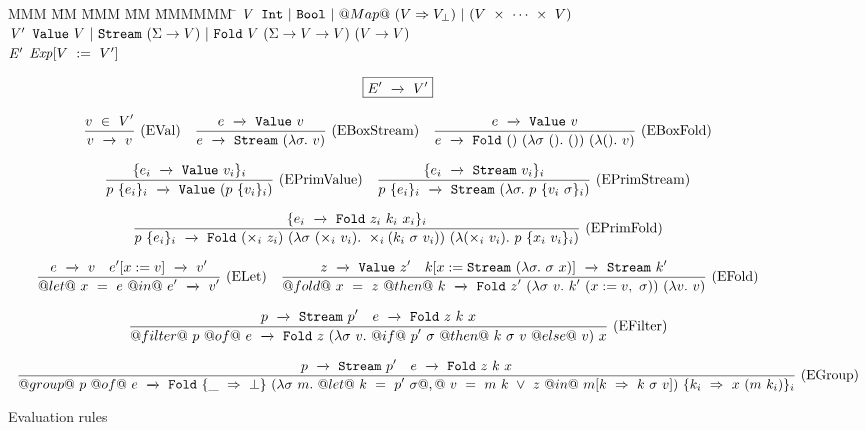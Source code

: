
\begin{figure*}

\begin{tabbing}
MMM \= MM \= MMM \= MM \= MMMMMM \= \kill
$\mathit{V}$
\GrammarDef
  $\mathtt{Int}~|~\mathtt{Bool}~|~@Map@~(V \Rightarrow V_\bot)~|~(V~\times~\cdots~\times~V)$
\\
$\mathit{V'}$
\GrammarDef
  $\texttt{Value}~V~|~\texttt{Stream}~(\Sigma \to V)~|~\texttt{Fold}~V~(\Sigma \to V \to V)~(V \to V)$
\\
$\mathit{E'}$
\GrammarDef
  $\mathit{Exp}[V~:=~V']$
\\
\end{tabbing}

$$
\boxed{E' ~\xrightarrow~~ V'}
$$

$$
\enskip \frac {\displaystyle 
    v~\in~V'
} {\displaystyle 
    v ~\xrightarrow~~ v
} \  \mbox{(EVal)} \enskip
\enskip \frac {\displaystyle 
    e ~\xrightarrow~~ \texttt{Value}~v
} {\displaystyle 
    e ~\xrightarrow~~ \texttt{Stream}~(\lambda{}\sigma.~ v)
} \  \mbox{(EBoxStream)} \enskip
\enskip \frac {\displaystyle 
    e ~\xrightarrow~~ \texttt{Value}~v
} {\displaystyle 
    e ~\xrightarrow~~ \texttt{Fold}~()~(\lambda{}\sigma~().~ ())~(\lambda{}().~ v)
} \  \mbox{(EBoxFold)} \enskip
$$

$$
\enskip \frac {\displaystyle 
  \{ e_i ~\xrightarrow~~ \texttt{Value}~v_i \}_i
} {\displaystyle 
  p~\{ e_i \}_i  ~\xrightarrow~~ \texttt{Value}~(p~\{v_i\}_i)
} \  \mbox{(EPrimValue)} \enskip
\enskip \frac {\displaystyle 
  \{ e_i ~\xrightarrow~~ \texttt{Stream}~v_i \}_i
} {\displaystyle 
  p~\{ e_i \}_i  ~\xrightarrow~~ \texttt{Stream}~(\lambda{}\sigma.~ p~\{v_i~\sigma\}_i)
} \  \mbox{(EPrimStream)} \enskip
$$

$$
\enskip \frac {\displaystyle 
  \{ e_i ~\xrightarrow~~ \texttt{Fold}~z_i~k_i~x_i \}_i
} {\displaystyle 
  p~\{ e_i \}_i  ~\xrightarrow~~ \texttt{Fold}~(\times_i~z_i)~(\lambda{}\sigma~(\times_i~v_i).~
        \times_i (k_i~\sigma~v_i))~(\lambda{}(\times_i~v_i).~
        p~\{x_i~v_i\}_i)
} \  \mbox{(EPrimFold)} \enskip
$$

$$
\enskip \frac {\displaystyle 
  e ~\xrightarrow~~ v
  \quad
  e'[x:=v] ~\xrightarrow~~ v'
} {\displaystyle 
  @let@~x~=~e~@in@~e' ~\xrightarrow~~ v'
} \  \mbox{(ELet)} \enskip
\enskip \frac {\displaystyle 
  z ~\xrightarrow~~ \texttt{Value}~z'
  \quad
  k[x:=\texttt{Stream}~(\lambda{}\sigma.~ \sigma~x)] ~\xrightarrow~~ \texttt{Stream}~k'
} {\displaystyle 
  @fold@~x~=~z~@then@~k ~\xrightarrow~~ \texttt{Fold}~z'~(\lambda{}\sigma~v.~ k'~(x:=v,~\sigma))~(\lambda{}v.~ v)
} \  \mbox{(EFold)} \enskip
$$

$$
\enskip \frac {\displaystyle 
  p ~\xrightarrow~~ \texttt{Stream}~p'
  \quad
  e ~\xrightarrow~~ \texttt{Fold}~z~k~x
} {\displaystyle 
  @filter@~p~@of@~e ~\xrightarrow~~ \texttt{Fold}~z~(\lambda{}\sigma~v.~
         @if@~p'~\sigma~@then@~k~\sigma~v~@else@~v)~x
} \  \mbox{(EFilter)} \enskip
$$

$$
\ruleIN
{
  \SourceStepX{p}{\VStream{p'}}
  \quad
  \SourceStepX{e}{\VFold{z}{k}{x}}
}
{
  \SourceStepX
    {@group@~p~@of@~e}
    {\VFold
      {\{\_~\Rightarrow~\bot\}}
      {(\lam{\sigma~m}
        @let@~k~=~p'~\sigma@,@~
              v~=~m~k~\vee~z
        ~@in@~
          m[k~\Rightarrow~k~\sigma~v])}
      {\{k_i~\Rightarrow~x~(m~k_i)\}_i}}
}{EGroup}
$$


\caption{Evaluation rules}
\label{fig:source:eval}
\end{figure*}


